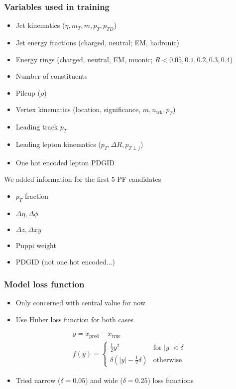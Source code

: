 \documentclass{beamer}
\begin{document}
\begin{frame}
  \frametitle{Variables used in training}

  \begin{itemize}
  \item Jet kinematics ($\eta, m_T, m, p_T, p_{TD}$)
  \item Jet energy fractions (charged, neutral; EM, hadronic)
  \item Energy rings (charged, neutral, EM, muonic; $R < 0.05, 0.1, 0.2, 0.3, 0.4$)
  \item Number of constituents
  \item Pileup ($\rho$)
  \item Vertex kinematics (location, significance, $m, n_\mathrm{trk}, p_T$)
  \item Leading track $p_T$
  \item Leading lepton kinematics ($p_T, \Delta R, p_{T\perp j}$)
  \item One hot encoded lepton PDGID
  \end{itemize}

  We added information for the first 5 PF candidates

  \begin{itemize}
  \item $p_T$ fraction
  \item $\Delta \eta, \Delta \phi$
  \item $\Delta z, \Delta xy$
  \item Puppi weight
  \item PDGID (not one hot encoded...)
  \end{itemize}

\end{frame}

\begin{frame}
  \frametitle{Model loss function}

  \begin{itemize}
  \item Only concerned with central value for now
  \item Use Huber loss function for both cases
  \end{itemize}

  \begin{gather*}
    y = x_\mathrm{pred} - x_\mathrm{true} \\
    f(y) = \begin{cases}
      \frac12 y^2 & \mbox{for } |y| < \delta \\
      \delta(|y| - \frac12 \delta) & \mbox{otherwise}
      \end{cases}
  \end{gather*}

  \begin{itemize}
  \item Tried narrow ($\delta = 0.05$) and wide ($\delta = 0.25$) loss functions
  \end{itemize}
\end{frame}
\end{document}
